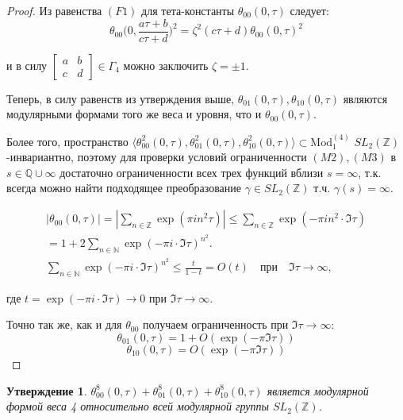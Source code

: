 \documentclass{article}
\newcommand{\ZZ}{\mathbb{Z}}
\newcommand{\NN}{\mathbb{N}}
\newcommand{\QQ}{\mathbb{Q}}
\theoremstyle{break}
\newtheorem{claim}{Утверждение}[section]
\newcommand{\ModkN}[2]{\text{Mod}_{#1}^{(#2)}}
\begin{document}
\begin{proof}
	Из равенства $(F1)$ для тета-константы $\theta_{00}(0, \tau)$ следует:
	$$
		\theta_{00}\Big(0, \frac{a \tau + b}{c \tau + d}\Big)^2 =
		\zeta^2 (c\tau + d) \theta_{00}(0, \tau)^2
	$$
	
	и в силу $\begin{bmatrix}
		a & b \\ c & d
	\end{bmatrix} \in \Gamma_4$ можно заключить $\zeta=\pm 1$.

	
	Теперь, в силу равенств из утверждения выше, $\theta_{01}(0, \tau), \theta_{10}(0, \tau)$
	 являются модулярными формами того же веса и уровня, что и $\theta_{00}(0, \tau)$.
	 
	Более того, пространство 
	$\langle 
	\theta^2_{00}(0, \tau), \theta^2_{01}(0, \tau), \theta^2_{10}(0, \tau) \rangle
	\subset \ModkN{1}{4}
	$
	$SL_2(\ZZ)$-инвариантно, поэтому
	для проверки условий ограниченности $(M2),(M3)$ в $s \in \QQ \cup \infty$ достаточно ограниченности всех трех функций
	вблизи $s = \infty$, т.к. всегда можно найти подходящее преобразование 
	$\gamma \in SL_2(\ZZ)$ т.ч. $\gamma(s)=\infty$.
	
	\begin{gather*}
			|\theta_{00}(0, \tau)| = |\sum_{n \in \ZZ} \exp(\pi i n^2 \tau)|
			\le \sum_{n \in \ZZ} \exp(-\pi i n^2 \cdot \Im \tau) \\
			= 1 + 2 \sum_{n \in \NN} \exp(-\pi i \cdot \Im \tau) ^ {n^2}. \\
			\sum_{n \in \NN} \exp(-\pi i \cdot \Im \tau) ^ {n^2} \le \frac{t}{1-t} = O(t) \quad \text{при} \quad \Im \tau \to \infty,
	\end{gather*}

	где $t=\exp(-\pi i \cdot \Im \tau) \to 0$ при $\Im \tau \to \infty$.

	Точно так же, как и для $\theta_{00}$ получаем ограниченность при $\Im \tau \to \infty$:
	$$
	\theta_{01}(0, \tau) = 1 + O(\exp(-\pi \Im \tau))
	$$
	$$
		\theta_{10}(0, \tau) = O(\exp(-\pi \Im \tau))
	$$
\end{proof}

\begin{claim}
	$\theta_{00}^8(0, \tau) + \theta_{01}^8(0, \tau) + \theta_{10}^8(0, \tau)$ является модулярной формой веса 4 относительно всей модулярной группы $SL_2(\ZZ)$.
\end{claim}
\end{document}
